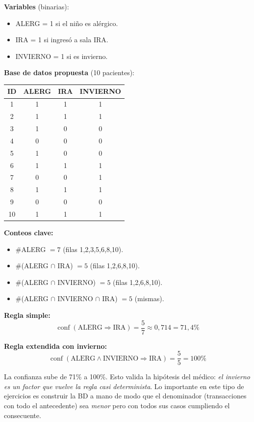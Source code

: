 \documentclass[11pt,a4paper]{article}
\newcommand{\conf}{\operatorname{conf}}
\begin{document}
\textbf{Variables} (binarias):
\begin{itemize}
    \item ALERG = 1 si el niño es alérgico.
    \item IRA = 1 si ingresó a sala IRA.
    \item INVIERNO = 1 si es invierno.
\end{itemize}

\textbf{Base de datos propuesta} (10 pacientes):

\begin{center}
\begin{tabular}{@{}cccc@{}}
\toprule
ID & ALERG & IRA & INVIERNO \\
\midrule
1 & 1 & 1 & 1 \\
2 & 1 & 1 & 1 \\
3 & 1 & 0 & 0 \\
4 & 0 & 0 & 0 \\
5 & 1 & 0 & 0 \\
6 & 1 & 1 & 1 \\
7 & 0 & 0 & 1 \\
8 & 1 & 1 & 1 \\
9 & 0 & 0 & 0 \\
10& 1 & 1 & 1 \\
\bottomrule
\end{tabular}
\end{center}

\textbf{Conteos clave:}
\begin{itemize}
    \item $\#$ALERG $= 7$ (filas 1,2,3,5,6,8,10).
    \item $\#$(ALERG $\cap$ IRA) $= 5$ (filas 1,2,6,8,10).
    \item $\#$(ALERG $\cap$ INVIERNO) $= 5$ (filas 1,2,6,8,10).
    \item $\#$(ALERG $\cap$ INVIERNO $\cap$ IRA) $= 5$ (mismas).
\end{itemize}

\textbf{Regla simple:}
\[
\conf(\text{ALERG} \Rightarrow \text{IRA}) = \frac{5}{7} \approx 0{,}714 = 71{,}4\%
\]

\textbf{Regla extendida con invierno:}
\[
\conf(\text{ALERG} \wedge \text{INVIERNO} \Rightarrow \text{IRA}) = \frac{5}{5} = 100\%
\]

\begin{intuicionbox}
La confianza sube de 71\% a 100\%. Esto valida la hipótesis del médico:
\emph{el invierno es un factor que vuelve la regla casi determinista}.
Lo importante en este tipo de ejercicios es construir la BD a mano de modo que el
denominador (transacciones con todo el antecedente) sea \emph{menor} pero con todos sus
casos cumpliendo el consecuente.
\end{intuicionbox}
\end{document}

